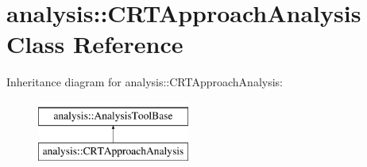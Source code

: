 \hypertarget{classanalysis_1_1CRTApproachAnalysis}{}\section{analysis\+:\+:C\+R\+T\+Approach\+Analysis Class Reference}
\label{classanalysis_1_1CRTApproachAnalysis}
Inheritance diagram for analysis\+:\+:C\+R\+T\+Approach\+Analysis\+:\begin{figure}[H]
\begin{center}
\leavevmode
\includegraphics[height=2.000000cm]{classanalysis_1_1CRTApproachAnalysis}
\end{center}
\end{figure}
